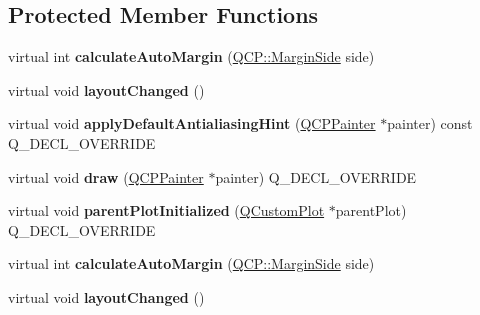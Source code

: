 \subsection*{Protected Member Functions}
\begin{DoxyCompactItemize}
\item 
virtual int {\bfseries calculate\+Auto\+Margin} (\hyperlink{namespace_q_c_p_a7e487e3e2ccb62ab7771065bab7cae54}{Q\+C\+P\+::\+Margin\+Side} side)\hypertarget{class_q_c_p_layout_element_a005c9f0fe84bc1591a2cf2c46fd477b4}{}\label{class_q_c_p_layout_element_a005c9f0fe84bc1591a2cf2c46fd477b4}

\item 
virtual void {\bfseries layout\+Changed} ()\hypertarget{class_q_c_p_layout_element_a765f041a73af0c2de41b41a5a03e31a4}{}\label{class_q_c_p_layout_element_a765f041a73af0c2de41b41a5a03e31a4}

\item 
virtual void {\bfseries apply\+Default\+Antialiasing\+Hint} (\hyperlink{class_q_c_p_painter}{Q\+C\+P\+Painter} $\ast$painter) const Q\+\_\+\+D\+E\+C\+L\+\_\+\+O\+V\+E\+R\+R\+I\+DE\hypertarget{class_q_c_p_layout_element_a0a8f18141bcf46cf40ad4c13324ff346}{}\label{class_q_c_p_layout_element_a0a8f18141bcf46cf40ad4c13324ff346}

\item 
virtual void {\bfseries draw} (\hyperlink{class_q_c_p_painter}{Q\+C\+P\+Painter} $\ast$painter) Q\+\_\+\+D\+E\+C\+L\+\_\+\+O\+V\+E\+R\+R\+I\+DE\hypertarget{class_q_c_p_layout_element_ad1c597b1d608cfdd86e7b76819a94cfb}{}\label{class_q_c_p_layout_element_ad1c597b1d608cfdd86e7b76819a94cfb}

\item 
virtual void {\bfseries parent\+Plot\+Initialized} (\hyperlink{class_q_custom_plot}{Q\+Custom\+Plot} $\ast$parent\+Plot) Q\+\_\+\+D\+E\+C\+L\+\_\+\+O\+V\+E\+R\+R\+I\+DE\hypertarget{class_q_c_p_layout_element_ab4bb5c5a958451f5f153fdce350f13cf}{}\label{class_q_c_p_layout_element_ab4bb5c5a958451f5f153fdce350f13cf}

\item 
virtual int {\bfseries calculate\+Auto\+Margin} (\hyperlink{namespace_q_c_p_a7e487e3e2ccb62ab7771065bab7cae54}{Q\+C\+P\+::\+Margin\+Side} side)\hypertarget{class_q_c_p_layout_element_a76b2b2f6a68d337b2faa3a9e96c87c9e}{}\label{class_q_c_p_layout_element_a76b2b2f6a68d337b2faa3a9e96c87c9e}

\item 
virtual void {\bfseries layout\+Changed} ()\hypertarget{class_q_c_p_layout_element_a11d34c67076e500041dd5448f573bbd5}{}\label{class_q_c_p_layout_element_a11d34c67076e500041dd5448f573bbd5}


\end{DoxyCompactItemize}
